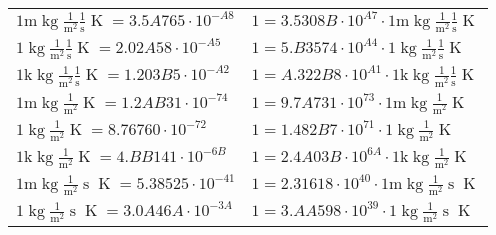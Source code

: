 \begin{center}
\begin{longtable}{l l}
{\color{gray}$1 \bm{\mathrm{ m}}\operatorname{kg}\frac1{\operatorname{m}^2}\frac1{\operatorname{s}}{}{\operatorname{K}} = 3.5A765\cdot10^{-A8} $}   & {\color{gray}$ 1 = 3.5308B\cdot10^{A7} \cdot 1 \bm{\mathrm{ m}}\operatorname{kg}\frac1{\operatorname{m}^2}\frac1{\operatorname{s}}{}{\operatorname{K}}$}  \\
{\color{black}$1 \bm{\mathrm{ }}\operatorname{kg}\frac1{\operatorname{m}^2}\frac1{\operatorname{s}}{}{\operatorname{K}} = 2.02A58\cdot10^{-A5} $}   & {\color{black}$ 1 = 5.B3574\cdot10^{A4} \cdot 1 \bm{\mathrm{ }}\operatorname{kg}\frac1{\operatorname{m}^2}\frac1{\operatorname{s}}{}{\operatorname{K}}$}  \\
{\color{gray}$1 \bm{\mathrm{ k}}\operatorname{kg}\frac1{\operatorname{m}^2}\frac1{\operatorname{s}}{}{\operatorname{K}} = 1.203B5\cdot10^{-A2} $}   & {\color{gray}$ 1 = A.322B8\cdot10^{A1} \cdot 1 \bm{\mathrm{ k}}\operatorname{kg}\frac1{\operatorname{m}^2}\frac1{\operatorname{s}}{}{\operatorname{K}}$}  \\
{\color{gray}$1 \bm{\mathrm{ m}}\operatorname{kg}\frac1{\operatorname{m}^2}{}{}{\operatorname{K}} = 1.2AB31\cdot10^{-74} $}   & {\color{gray}$ 1 = 9.7A731\cdot10^{73} \cdot 1 \bm{\mathrm{ m}}\operatorname{kg}\frac1{\operatorname{m}^2}{}{}{\operatorname{K}}$}  \\
{\color{black}$1 \bm{\mathrm{ }}\operatorname{kg}\frac1{\operatorname{m}^2}{}{}{\operatorname{K}} = 8.76760\cdot10^{-72} $}   & {\color{black}$ 1 = 1.482B7\cdot10^{71} \cdot 1 \bm{\mathrm{ }}\operatorname{kg}\frac1{\operatorname{m}^2}{}{}{\operatorname{K}}$}  \\
{\color{gray}$1 \bm{\mathrm{ k}}\operatorname{kg}\frac1{\operatorname{m}^2}{}{}{\operatorname{K}} = 4.BB141\cdot10^{-6B} $}   & {\color{gray}$ 1 = 2.4A03B\cdot10^{6A} \cdot 1 \bm{\mathrm{ k}}\operatorname{kg}\frac1{\operatorname{m}^2}{}{}{\operatorname{K}}$}  \\
{\color{gray}$1 \bm{\mathrm{ m}}\operatorname{kg}\frac1{\operatorname{m}^2}{\operatorname{s}}{}{\operatorname{K}} = 5.38525\cdot10^{-41} $}   & {\color{gray}$ 1 = 2.31618\cdot10^{40} \cdot 1 \bm{\mathrm{ m}}\operatorname{kg}\frac1{\operatorname{m}^2}{\operatorname{s}}{}{\operatorname{K}}$}  \\
{\color{black}$1 \bm{\mathrm{ }}\operatorname{kg}\frac1{\operatorname{m}^2}{\operatorname{s}}{}{\operatorname{K}} = 3.0A46A\cdot10^{-3A} $}   & {\color{black}$ 1 = 3.AA598\cdot10^{39} \cdot 1 \bm{\mathrm{ }}\operatorname{kg}\frac1{\operatorname{m}^2}{\operatorname{s}}{}{\operatorname{K}}$}  \\

\end{longtable}
\end{center}
